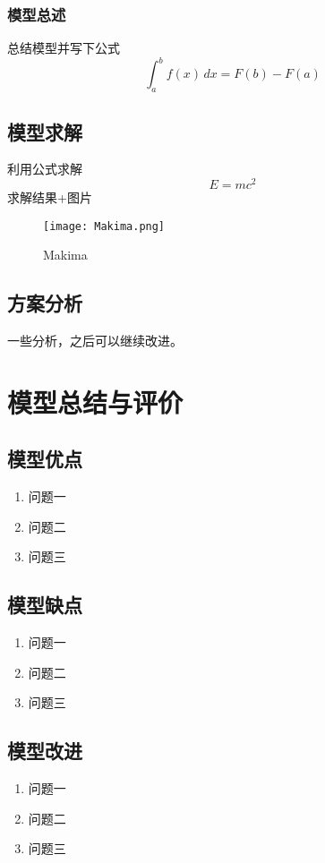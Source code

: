 \documentclass[12pt,a4paper]{article}
\begin{document}
\subsubsection{模型总述}
总结模型并写下公式
\begin{equation}
  \int_a^b f(x) \, dx = F(b) - F(a)
\end{equation}
\subsection{模型求解}
利用公式求解
\begin{equation}
  E=mc^2
\end{equation}
求解结果+图片
\begin{figure}[H]%
  \centering
  \texttt{[image: Makima.png]}
  \caption{Makima}
  \label{img:Makima}    
\end{figure}

\subsection{方案分析}
一些分析，之后可以继续改进。
\section{模型总结与评价}
\subsection{模型优点}
\begin{enumerate}[itemsep=-0.2em,topsep=0em]
  \item 问题一
  \item 问题二
  \item 问题三
\end{enumerate}

\subsection{模型缺点}
\begin{enumerate}[itemsep=-0.2em,topsep=0em]
  \item 问题一
  \item 问题二
  \item 问题三
\end{enumerate}

\subsection{模型改进}
\begin{enumerate}[itemsep=-0.2em,topsep=0em]
  \item 问题一
  \item 问题二
  \item 问题三
\end{enumerate}
\end{document}

